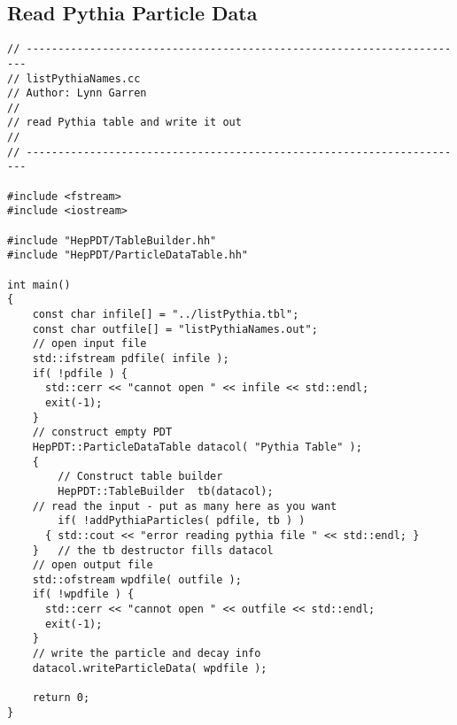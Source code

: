 \subsection { Read Pythia Particle Data }
\begin{verbatim}
// ----------------------------------------------------------------------
// listPythiaNames.cc
// Author: Lynn Garren
//
// read Pythia table and write it out
//
// ----------------------------------------------------------------------

#include <fstream>
#include <iostream>

#include "HepPDT/TableBuilder.hh"
#include "HepPDT/ParticleDataTable.hh"

int main()
{
    const char infile[] = "../listPythia.tbl";
    const char outfile[] = "listPythiaNames.out";
    // open input file
    std::ifstream pdfile( infile );
    if( !pdfile ) { 
      std::cerr << "cannot open " << infile << std::endl;
      exit(-1);
    }
    // construct empty PDT
    HepPDT::ParticleDataTable datacol( "Pythia Table" );
    {
        // Construct table builder
        HepPDT::TableBuilder  tb(datacol);
	// read the input - put as many here as you want
        if( !addPythiaParticles( pdfile, tb ) ) 
	  { std::cout << "error reading pythia file " << std::endl; }
    }	// the tb destructor fills datacol
    // open output file
    std::ofstream wpdfile( outfile );
    if( !wpdfile ) { 
      std::cerr << "cannot open " << outfile << std::endl;
      exit(-1);
    }
    // write the particle and decay info
    datacol.writeParticleData( wpdfile );

    return 0;
}
\end{verbatim}


